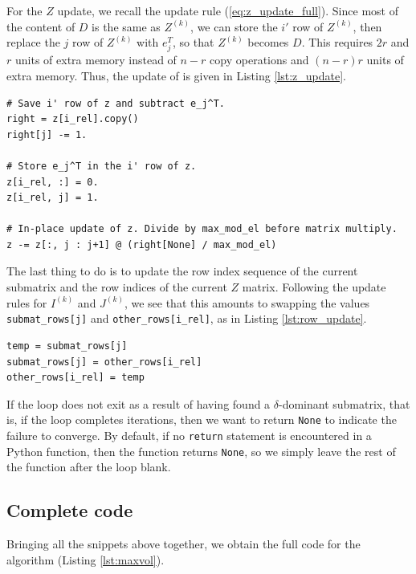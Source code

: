 \documentclass{article}
\begin{document}
	For the $Z$ update, we recall the update rule (\ref{eq:z_update_full}). Since most of the content of $D$ is the same as $Z^{(k)}$, we can store the $i'$ row of $Z^{(k)}$, then replace the $j$ row of $Z^{(k)}$ with $e_j^T$, so that $Z^{(k)}$ becomes $D$. This requires $2r$ and $r$ units of extra memory instead of $n-r$ copy operations and $(n-r)r$ units of extra memory. Thus, the update of \vz{} is given in Listing \ref{lst:z_update}.
	\begin{lstlisting}[caption={$Z$ update}, label=lst:z_update]
# Save i' row of z and subtract e_j^T.
right = z[i_rel].copy()
right[j] -= 1.

# Store e_j^T in the i' row of z.
z[i_rel, :] = 0.
z[i_rel, j] = 1.

# In-place update of z. Divide by max_mod_el before matrix multiply.
z -= z[:, j : j+1] @ (right[None] / max_mod_el)
	\end{lstlisting}
	
	
	The last thing to do is to update the row index sequence of the current submatrix and the row indices of the current $Z$ matrix. Following the update rules for $I^{(k)}$ and $J^{(k)}$, we see that this amounts to swapping the values \texttt{submat\_rows[j]} and \texttt{other\_rows[i\_rel]}, as in Listing \ref{lst:row_update}.
	\begin{lstlisting}[caption={row index update}, label=lst:row_update]
temp = submat_rows[j]
submat_rows[j] = other_rows[i_rel]
other_rows[i_rel] = temp
	\end{lstlisting}
	
	
	If the loop does not exit as a result of having found a $\delta$-dominant submatrix, that is, if the loop completes \vmaxiter{} iterations, then we want to return \texttt{None} to indicate the failure to converge. By default, if no \texttt{return} statement is encountered in a Python function, then the function returns \texttt{None}, so we simply leave the rest of the function after the loop blank.
	
	\subsection{Complete code}
	Bringing all the snippets above together, we obtain the full code for the \maxvol{} algorithm (Listing \ref{lst:maxvol}).
	
	
\end{document}
